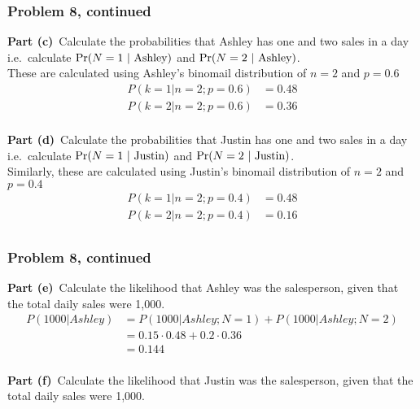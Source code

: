 \documentclass[12pt]{article}
\theoremstyle{definition}
\begin{document}
\newpage
\subsubsection*{Problem 8, continued}
\noindent
{\bf Part (c)}\ Calculate the probabilities that Ashley has one and two sales in a day i.e.\ calculate $\Pr(N = 1\ |\ \hbox{Ashley})$ and $\Pr(N = 2\ |\ \hbox{Ashley})$.\\

These are calculated using Ashley's binomail distribution of $n = 2$ and $p = 0.6$
\begin{align*}
P(k = 1|n = 2;p = 0.6) &= 0.48\\
P(k = 2|n = 2;p = 0.6) &= 0.36\\
\end{align*}



\vspace{3in}
\noindent
{\bf Part (d)}\ Calculate the probabilities that Justin has one and two sales in a day i.e.\ calculate $\Pr(N = 1\ |\ \hbox{Justin})$ and $\Pr(N = 2\ |\ \hbox{Justin})$.\\

Similarly, these are calculated using Justin's binomail distribution of $n = 2$ and $p = 0.4$
\begin{align*}
P(k = 1|n = 2;p = 0.4) &= 0.48\\
P(k = 2|n = 2;p = 0.4) &= 0.16\\
\end{align*}


\newpage
\subsubsection*{Problem 8, continued}
\noindent
{\bf Part (e)}\ Calculate the likelihood that Ashley was the salesperson, given that the total daily sales were 1,000.\\

\begin{align*}
P(1000|Ashley) &= P(1000|Ashley;N=1) + P(1000|Ashley;N=2)\\
&= 0.15 \cdot 0.48 +  0.2 \cdot 0.36\\
&= 0.144\\
\end{align*}




\vspace{3in}
\noindent
{\bf Part (f)}\ Calculate the likelihood that Justin was the salesperson, given that the total daily sales were 1,000.\\
\end{document}
